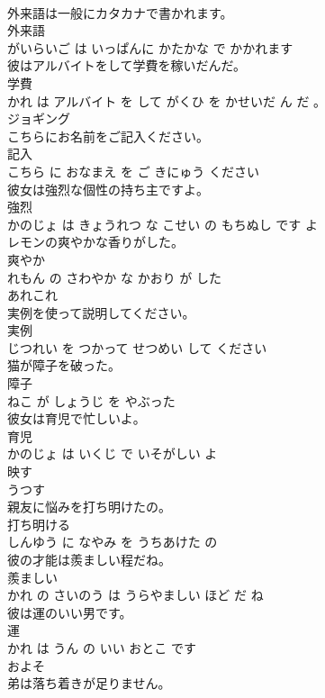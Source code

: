 \documentclass[8pt]{extreport}
\begin{document}
\begin{CJK}{UTF8}{min}
\\	外来語は一般にカタカナで書かれます。	
\\	外来語 
\\	がいらいご は いっぱんに かたかな で かかれます			
\\	彼はアルバイトをして学費を稼いだんだ。	
\\	学費 
\\	かれ は アルバイト を して がくひ を かせいだ ん だ 。			
\\	ジョギング	
\\	こちらにお名前をご記入ください。	
\\	記入 
\\	こちら に おなまえ を ご きにゅう ください			
\\	彼女は強烈な個性の持ち主ですよ。	
\\	強烈 
\\	かのじょ は きょうれつ な こせい の もちぬし です よ			
\\	レモンの爽やかな香りがした。	
\\	爽やか 
\\	れもん の さわやか な かおり が した			
\\	あれこれ	
\\	実例を使って説明してください。	
\\	実例 
\\	じつれい を つかって せつめい して ください			
\\	猫が障子を破った。	
\\	障子 
\\	ねこ が しょうじ を やぶった			
\\	彼女は育児で忙しいよ。	
\\	育児 
\\	かのじょ は いくじ で いそがしい よ			
\\	映す	
\\	うつす			
\\	親友に悩みを打ち明けたの。	
\\	打ち明ける 
\\	しんゆう に なやみ を うちあけた の			
\\	彼の才能は羨ましい程だね。	
\\	羨ましい 
\\	かれ の さいのう は うらやましい ほど だ ね			
\\	彼は運のいい男です。	
\\	運 
\\	かれ は うん の いい おとこ です			
\\	およそ	
\\	弟は落ち着きが足りません。	

\end{CJK}
\end{document}

